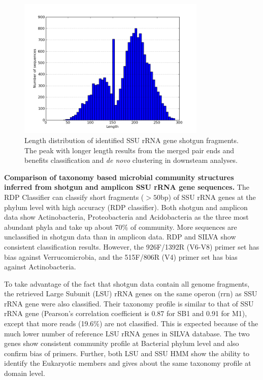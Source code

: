 \documentclass[12pt]{article}
\begin{document}
    \begin{figure}[tbph!]
    \centering
    \includegraphics[width=0.8\textwidth]{figs/read_length_dist.png}
    \caption[Length distribution of identified SSU rRNA gene shotgun fragments]{Length distribution of identified SSU rRNA gene shotgun fragments. The peak with longer length results from the merged pair ends and benefits classification and {\em de novo} clustering in downsteam analyses.}
    \label{fig:read_length_dist}
    \end{figure}



  {\bf Comparison of taxonomy based microbial community structures inferred from shotgun and amplicon SSU rRNA gene sequences. }
The RDP Classifier can classify short fragments ($>50$bp) of SSU rRNA genes at the phylum level with high accuracy (RDP classifier). Both shotgun and amplicon data show Actinobacteria, Proteobacteria and Acidobacteria as the three most abundant phyla and take up about 70\% of community. More sequences are unclassified in shotgun data than in amplicon data. RDP and SILVA show consistent classification results. However, the 926F/1392R (V6-V8) primer set has bias against Verrucomicrobia, and the 515F/806R (V4) primer set has bias against Actinobacteria.

  To take advantage of the fact that shotgun data contain all genome fragments, the retrieved Large Subunit (LSU) rRNA genes on the same operon (rrn) as SSU rRNA gene were also classified. Their taxonomy profile is similar to that of SSU rRNA gene (Pearson’s correlation coefficient is 0.87 for SB1 and 0.91 for M1), except that more reads (19.6\%) are not classified. This is expected because of the much lower number of reference LSU rRNA genes in SILVA database. The two genes show consistent community profile at Bacterial phylum level and also confirm bias of primers. Further, both LSU and SSU HMM show the ability to identify the Eukaryotic members and gives about the same taxonomy profile at domain level.
\end{document}
